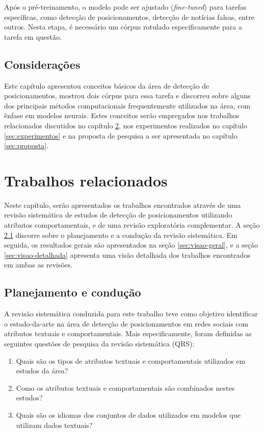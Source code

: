 \documentclass[
	12pt, oneside, a4paper, english, brazil
]{abntex2ppgsi}
\begin{document}
Após o pré-treinamento, o modelo pode ser ajustado ({\em fine-tuned}) para tarefas específicas, como detecção de posicionamentos, detecção de notícias falsas, entre outros. Nesta etapa, é necessário um córpus rotulado especificamente para a tarefa em questão.

\section{Considerações}

Este capítulo apresentou conceitos básicos da área de detecção de posicionamentos, mostrou dois córpus para essa tarefa e discorreu sobre alguns dos principais métodos computacionais frequentemente utilizados na área, com ênfase em modelos neurais. Estes conceitos serão empregados nos trabalhos relacionados discutidos no capítulo \ref{sec:trabalhos-relacionados}, nos experimentos realizados no capítulo \ref{sec:experimentos} e na proposta de pesquisa a ser apresentada no capítulo \ref{sec:proposta}.

\chapter{Trabalhos relacionados}
\label{sec:trabalhos-relacionados}

Neste capítulo, serão apresentados os trabalhos encontrados através de uma revisão sistemática de estudos de detecção de posicionamentos utilizando atributos comportamentais, e de uma revisão exploratória complementar. A seção \ref{sec:planejamento-conducao} discorre sobre o planejamento e a condução da revisão sistemática. Em seguida, os resultados gerais são apresentados na seção \ref{sec:visao-geral}, e a seção \ref{sec:visao-detalhada} apresenta uma visão detalhada dos trabalhos encontrados em ambas as revisões.

\section{Planejamento e condução}
\label{sec:planejamento-conducao}

A revisão sistemática conduzida para este trabalho teve como objetivo identificar o estado-da-arte na área de detecção de posicionamentos em redes sociais com atributos textuais e comportamentais. Mais especificamente, foram definidas as seguintes questões de pesquisa da revisão sistemática (QRS):

\begin{enumerate}
    \item[QRS 1.] Quais são os tipos de atributos textuais e comportamentais utilizados em estudos da área?
    \item[QRS 2.] Como os atributos textuais e comportamentais são combinados nestes estudos?
    \item[QRS 3.] Quais são os idiomas dos conjuntos de dados utilizados em modelos que utilizam dados textuais?
\end{enumerate}
\end{document}

